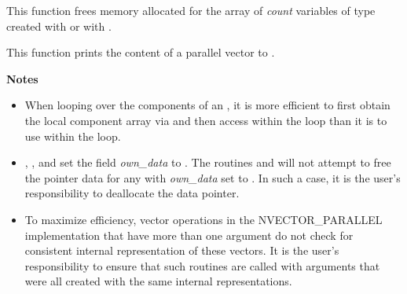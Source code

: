 \documentclass[letterpaper,10pt,english]{sphinxmanual}
\begin{document}

\begin{fulllineitems}
\label{nvectors/NVector_Parallel:c.N_VDestroyVectorArray_Parallel}
This function frees memory allocated for the array of \emph{count}
variables of type  created with
{\hyperref[nvectors/NVector_Parallel:c.N_VCloneVectorArray_Parallel]{\emph{}}} or with
{\hyperref[nvectors/NVector_Parallel:c.N_VCloneEmptyVectorArray_Parallel]{\emph{}}}.

\end{fulllineitems}


\begin{fulllineitems}
\label{nvectors/NVector_Parallel:c.N_VPrint_Parallel}
This function prints the content of a parallel vector to .

\end{fulllineitems}


\textbf{Notes}
\begin{itemize}
\item {} 
When looping over the components of an , it is
more efficient to first obtain the local component array via  and then access  within the loop than it
is to use  within the loop.

\item {} 
{\hyperref[nvectors/NVector_Parallel:c.N_VNewEmpty_Parallel]{\emph{}}}, {\hyperref[nvectors/NVector_Parallel:c.N_VMake_Parallel]{\emph{}}}, and
{\hyperref[nvectors/NVector_Parallel:c.N_VCloneEmptyVectorArray_Parallel]{\emph{}}} set the field \emph{own\_data} to
. The routines  and
{\hyperref[nvectors/NVector_Parallel:c.N_VDestroyVectorArray_Parallel]{\emph{}}} will not attempt to free the
pointer data for any  with \emph{own\_data} set to
. In such a case, it is the user's responsibility to
deallocate the data pointer.

\item {} 
To maximize efficiency, vector operations in the NVECTOR\_PARALLEL
implementation that have more than one  argument do not
check for consistent internal representation of these vectors. It is
the user's responsibility to ensure that such routines are called
with  arguments that were all created with the same
internal representations.

\end{itemize}
\end{document}
